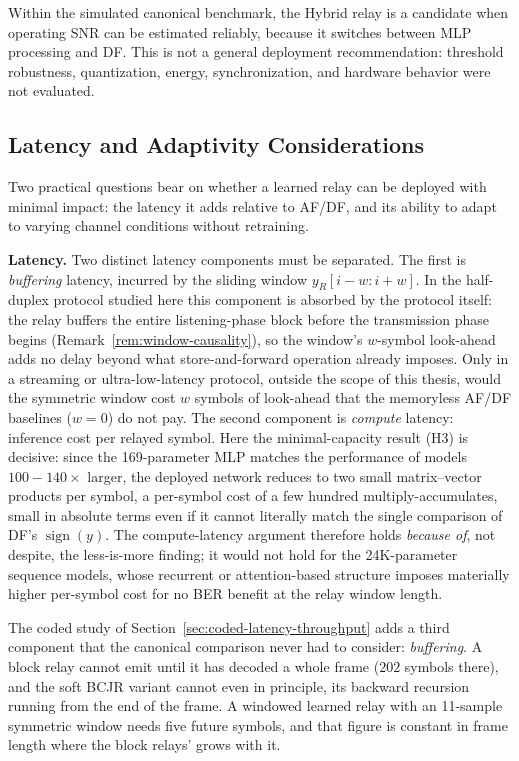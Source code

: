 Within the simulated canonical benchmark, the Hybrid relay is a candidate when operating SNR can be estimated reliably, because it switches between MLP processing and DF. This is not a general deployment recommendation: threshold robustness, quantization, energy, synchronization, and hardware behavior were not evaluated.

\subsection{Latency and Adaptivity Considerations}\label{sec:latency-and-adaptivity-considerations}

Two practical questions bear on whether a learned relay can be deployed with minimal impact: the latency it adds relative to AF/DF, and its ability to adapt to varying channel conditions without retraining.

\textbf{Latency.} Two distinct latency components must be separated. The first is \emph{buffering} latency, incurred by the sliding window $y_R[i-w:i+w]$. In the half-duplex protocol studied here this component is absorbed by the protocol itself: the relay buffers the entire listening-phase block before the transmission phase begins (Remark~\ref{rem:window-causality}), so the window's $w$-symbol look-ahead adds no delay beyond what store-and-forward operation already imposes. Only in a streaming or ultra-low-latency protocol, outside the scope of this thesis, would the symmetric window cost $w$ symbols of look-ahead that the memoryless AF/DF baselines ($w=0$) do not pay. The second component is \emph{compute} latency: inference cost per relayed symbol. Here the minimal-capacity result (H3) is decisive: since the 169-parameter MLP matches the performance of models $100-140\times$ larger, the deployed network reduces to two small matrix--vector products per symbol, a per-symbol cost of a few hundred multiply-accumulates, small in absolute terms even if it cannot literally match the single comparison of DF's $\operatorname{sign}(y)$. The compute-latency argument therefore holds \emph{because of}, not despite, the less-is-more finding; it would not hold for the 24K-parameter sequence models, whose recurrent or attention-based structure imposes materially higher per-symbol cost for no BER benefit at the relay window length.

The coded study of Section~\ref{sec:coded-latency-throughput} adds a third component that the canonical comparison never had to consider: \emph{buffering}. A block relay cannot emit until it has decoded a whole frame ($202$ symbols there), and the soft BCJR variant cannot even in principle, its backward recursion running from the end of the frame. A windowed learned relay with an 11-sample symmetric window needs five future symbols, and that figure is constant in frame length where the block relays' grows with it.

